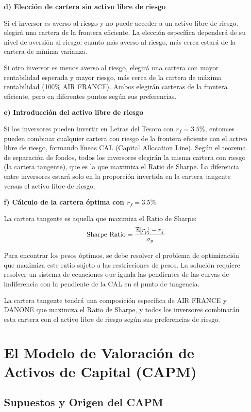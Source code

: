 \begin{ejemplo}
\textbf{d) Elección de cartera sin activo libre de riesgo}

Si el inversor es averso al riesgo y no puede acceder a un activo libre de riesgo, elegirá una cartera de la frontera eficiente. La elección específica dependerá de su nivel de aversión al riesgo: cuanto más averso al riesgo, más cerca estará de la cartera de mínima varianza.

Si otro inversor es menos averso al riesgo, elegirá una cartera con mayor rentabilidad esperada y mayor riesgo, más cerca de la cartera de máxima rentabilidad (100\% AIR FRANCE). Ambos elegirán carteras de la frontera eficiente, pero en diferentes puntos según sus preferencias.

\textbf{e) Introducción del activo libre de riesgo}

Si los inversores pueden invertir en Letras del Tesoro con $r_f = 3.5\%$, entonces pueden combinar cualquier cartera con riesgo de la frontera eficiente con el activo libre de riesgo, formando líneas CAL (Capital Allocation Line). Según el teorema de separación de fondos, todos los inversores elegirán la misma cartera con riesgo (la cartera tangente), que es la que maximiza el Ratio de Sharpe. La diferencia entre inversores estará solo en la proporción invertida en la cartera tangente versus el activo libre de riesgo.

\textbf{f) Cálculo de la cartera óptima con $r_f = 3.5\%$}

La cartera tangente es aquella que maximiza el Ratio de Sharpe:
$$\text{Sharpe Ratio} = \frac{\mathbb{E}[r_p] - r_f}{\sigma_p}$$

Para encontrar los pesos óptimos, se debe resolver el problema de optimización que maximiza este ratio sujeto a las restricciones de pesos. La solución requiere resolver un sistema de ecuaciones que iguala las pendientes de las curvas de indiferencia con la pendiente de la CAL en el punto de tangencia.

La cartera tangente tendrá una composición específica de AIR FRANCE y DANONE que maximiza el Ratio de Sharpe, y todos los inversores combinarán esta cartera con el activo libre de riesgo según sus preferencias de riesgo.
\end{ejemplo}

\section{El Modelo de Valoración de Activos de Capital (CAPM)}

\subsection{Supuestos y Origen del CAPM}

